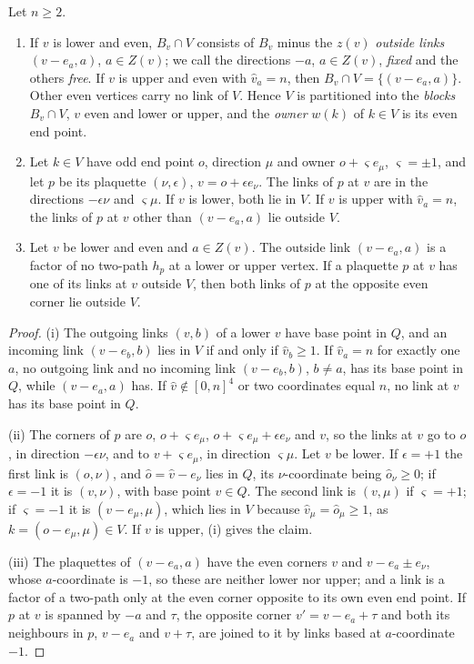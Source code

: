 \begin{lemma}\label{lem:cubestars}
Let $n\ge2$.
\begin{enumerate}[label=\textup{(\roman*)},leftmargin=*]
\item If $v$ is lower and even, $B_v\cap V$ consists of $B_v$ minus the
$z(v)$ \emph{outside links} $(v-e_a,a)$, $a\in Z(v)$; we call the directions
$-a$, $a\in Z(v)$, \emph{fixed} and the others \emph{free}. If $v$ is upper
and even with $\hat v_a=n$, then $B_v\cap V=\{(v-e_a,a)\}$. Other even vertices
carry no link of $V$. Hence $V$ is partitioned into the \emph{blocks}
$B_v\cap V$, $v$ even and lower or upper, and the \emph{owner} $w(k)$ of
$k\in V$ is its even end point.
\item Let $k\in V$ have odd end point $o$, direction $\mu$ and owner
$o+\varsigma e_\mu$, $\varsigma=\pm1$, and let $p$ be its plaquette
$(\nu,\epsilon)$, $v=o+\epsilon e_\nu$. The links of $p$ at $v$ are in the
directions $-\epsilon\nu$ and $\varsigma\mu$. If $v$ is lower, both lie in
$V$. If $v$ is upper with $\hat v_a=n$, the links of $p$ at $v$ other than
$(v-e_a,a)$ lie outside $V$.
\item Let $v$ be lower and even and $a\in Z(v)$. The outside link $(v-e_a,a)$
is a factor of no two-path $h_p$ at a lower or upper vertex. If a plaquette
$p$ at $v$ has one of its links at $v$ outside $V$, then both links of $p$ at
the opposite even corner lie outside $V$.
\end{enumerate}
\end{lemma}

\begin{proof}
(i) The outgoing links $(v,b)$ of a lower $v$ have base point in $Q$, and an
incoming link $(v-e_b,b)$ lies in $V$ if and only if $\hat v_b\ge1$. If
$\hat v_a=n$ for exactly one $a$, no outgoing link and no incoming link
$(v-e_b,b)$, $b\ne a$, has its base point in $Q$, while $(v-e_a,a)$ has. If
$\hat v\notin[0,n]^4$ or two coordinates equal $n$, no link at $v$ has its base
point in $Q$.

(ii) The corners of $p$ are $o$, $o+\varsigma e_\mu$, $o+\varsigma e_\mu+
\epsilon e_\nu$ and $v$, so the links at $v$ go to $o$, in direction
$-\epsilon\nu$, and to $v+\varsigma e_\mu$, in direction $\varsigma\mu$. Let $v$
be lower. If $\epsilon=+1$ the first link is $(o,\nu)$, and $\hat o=\hat v-e_\nu$
lies in $Q$, its $\nu$-coordinate being $\hat o_\nu\ge0$; if $\epsilon=-1$ it is
$(v,\nu)$, with base point $v\in Q$. The second link is $(v,\mu)$ if
$\varsigma=+1$; if $\varsigma=-1$ it is $(v-e_\mu,\mu)$, which lies in $V$
because $\hat v_\mu=\hat o_\mu\ge1$, as $k=(o-e_\mu,\mu)\in V$. If $v$ is upper,
(i) gives the claim.

(iii) The plaquettes of $(v-e_a,a)$ have the even corners $v$ and
$v-e_a\pm e_\nu$, whose $a$-coordinate is $-1$, so these are neither lower nor
upper; and a link is a factor of a two-path only at the even corner opposite
to its own even end point. If $p$ at $v$ is spanned by $-a$ and $\tau$, the
opposite corner $v'=v-e_a+\tau$ and both its neighbours in $p$, $v-e_a$ and
$v+\tau$, are joined to it by links based at $a$-coordinate $-1$.
\end{proof}

